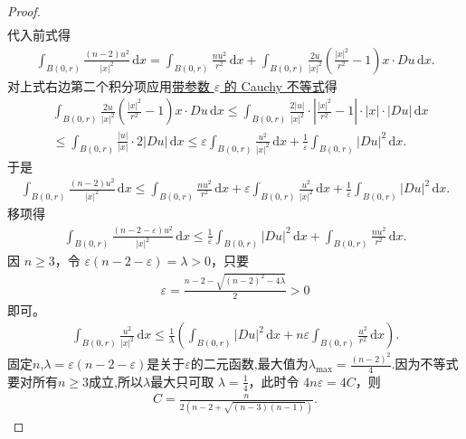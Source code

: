 \documentclass[../../main.tex]{subfiles}
\begin{document}
\begin{proof}
\begin{align}
\end{align}
代入前式得
\begin{align*}
\int_{B(0,r)} \frac{(n-2)u^2}{|x|^2} \,\mathrm{d}x
= \int_{B(0,r)} \frac{n u^2}{r^2} \,\mathrm{d}x
+ \int_{B(0,r)} \frac{2u}{|x|^2} \left( \frac{|x|^2}{r^2} - 1 \right) x\cdot Du \,\mathrm{d}x.
\end{align*}
对上式右边第二个积分项应用\hyperref[theorem:带参的Cauchy不等式]{带参数 $\varepsilon$ 的 Cauchy 不等式}得
\begin{align*}
&\int_{B(0,r)}{\frac{2u}{|x|^2}\left( \frac{|x|^2}{r^2}-1 \right) x\cdot Du\,\mathrm{d}x}\leqslant \int_{B(0,r)}{\frac{2\left| u \right|}{|x|^2}\cdot \left| \frac{|x|^2}{r^2}-1 \right|\cdot \left| x \right|\cdot \left| Du \right|\,\mathrm{d}x}
\\
&\leqslant \int_{B(0,r)}{\frac{\left| u \right|}{|x|}\cdot 2\left| Du \right|\,\mathrm{d}x}\leqslant \varepsilon \int_{B(0,r)}{\frac{u^2}{|x|^2}\,\mathrm{d}x}+\frac{1}{\varepsilon}\int_{B(0,r)}{|Du|^2\,\mathrm{d}x}.
\end{align*}
于是
\begin{align*}
\int_{B(0,r)} \frac{(n-2)u^2}{|x|^2} \,\mathrm{d}x
\leqslant \int_{B(0,r)} \frac{n u^2}{r^2} \,\mathrm{d}x
+ \varepsilon \int_{B(0,r)} \frac{u^2}{|x|^2} \,\mathrm{d}x
+ \frac{1}{\varepsilon} \int_{B(0,r)} |Du|^2 \,\mathrm{d}x.
\end{align*}
移项得
\begin{align*}
\int_{B(0,r)} \frac{(n-2-\varepsilon)u^2}{|x|^2} \,\mathrm{d}x
\leqslant \frac{1}{\varepsilon} \int_{B(0,r)} |Du|^2 \,\mathrm{d}x
+ \int_{B(0,r)} \frac{n u^2}{r^2} \,\mathrm{d}x.
\end{align*}
因 $n\geqslant 3$，令 $\varepsilon(n-2-\varepsilon) = \lambda > 0$，只要
\begin{align*}
\varepsilon = \frac{n-2 - \sqrt{(n-2)^2 - 4\lambda}}{2} > 0
\end{align*}
即可。
\begin{align*}
\int_{B(0,r)} \frac{u^2}{|x|^2} \,\mathrm{d}x
\leqslant \frac{1}{\lambda} \left( \int_{B(0,r)} |Du|^2 \,\mathrm{d}x
+ n\varepsilon \int_{B(0,r)} \frac{u^2}{r^2} \,\mathrm{d}x \right)
.
\end{align*}
固定$n$,$\lambda=\varepsilon(n-2-\varepsilon)$是关于$\varepsilon$的二元函数,最大值为$\lambda_{\text{max}}=\frac{(n-2)^2}{4}$.因为不等式要对所有$n\geqslant 3$成立,所以$\lambda$最大只可取 $\lambda = \frac{1}{4}$，此时令
$4n\varepsilon = 4C$，则
\begin{align*}
C = \frac{n}{2(n-2 + \sqrt{(n-3)(n-1)})}.
\end{align*}

\end{proof}
\end{document}
